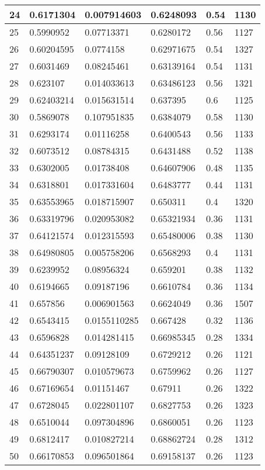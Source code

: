 \begin{longtable}{|l|l|l|l|l|l|}
24 & 0.6171304 & 0.007914603 & 0.6248093 & 0.54 & 1130 \\ \hline 
25 & 0.5990952 & 0.07713371 & 0.6280172 & 0.56 & 1127 \\ \hline 
26 & 0.60204595 & 0.0774158 & 0.62971675 & 0.54 & 1327 \\ \hline 
27 & 0.6031469 & 0.08245461 & 0.63139164 & 0.54 & 1131 \\ \hline 
28 & 0.623107 & 0.014033613 & 0.63486123 & 0.56 & 1321 \\ \hline 
29 & 0.62403214 & 0.015631514 & 0.637395 & 0.6 & 1125 \\ \hline 
30 & 0.5869078 & 0.107951835 & 0.6384079 & 0.58 & 1130 \\ \hline 
31 & 0.6293174 & 0.01116258 & 0.6400543 & 0.56 & 1133 \\ \hline 
32 & 0.6073512 & 0.08784315 & 0.6431488 & 0.52 & 1138 \\ \hline 
33 & 0.6302005 & 0.01738408 & 0.64607906 & 0.48 & 1135 \\ \hline 
34 & 0.6318801 & 0.017331604 & 0.6483777 & 0.44 & 1131 \\ \hline 
35 & 0.63553965 & 0.018715907 & 0.650311 & 0.4 & 1320 \\ \hline 
36 & 0.63319796 & 0.020953082 & 0.65321934 & 0.36 & 1131 \\ \hline 
37 & 0.64121574 & 0.012315593 & 0.65480006 & 0.38 & 1130 \\ \hline 
38 & 0.64980805 & 0.005758206 & 0.6568293 & 0.4 & 1131 \\ \hline 
39 & 0.6239952 & 0.08956324 & 0.659201 & 0.38 & 1132 \\ \hline 
40 & 0.6194665 & 0.09187196 & 0.6610784 & 0.36 & 1134 \\ \hline 
41 & 0.657856 & 0.006901563 & 0.6624049 & 0.36 & 1507 \\ \hline 
42 & 0.6543415 & 0.0155110285 & 0.667428 & 0.32 & 1136 \\ \hline 
43 & 0.6596828 & 0.014281415 & 0.66985345 & 0.28 & 1334 \\ \hline 
44 & 0.64351237 & 0.09128109 & 0.6729212 & 0.26 & 1121 \\ \hline 
45 & 0.66790307 & 0.010579673 & 0.6759962 & 0.26 & 1127 \\ \hline 
46 & 0.67169654 & 0.01151467 & 0.67911 & 0.26 & 1322 \\ \hline 
47 & 0.6728045 & 0.022801107 & 0.6827753 & 0.26 & 1323 \\ \hline 
48 & 0.6510044 & 0.097304896 & 0.6860051 & 0.26 & 1123 \\ \hline 
49 & 0.6812417 & 0.010827214 & 0.68862724 & 0.28 & 1312 \\ \hline 
50 & 0.66170853 & 0.096501864 & 0.69158137 & 0.26 & 1123 \\ \hline 
\end{longtable}